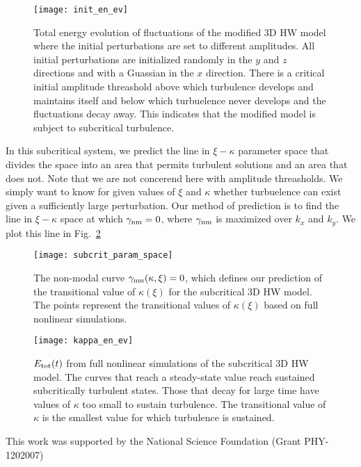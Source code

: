 \documentclass[letter,scriptaddress,twocolumn, prl,showkeys]{revtex4}
\begin{document}
\begin{figure}
\centerline{\texttt{[image: init\_en\_ev]}}
\caption{Total energy evolution of fluctuations of the modified 3D HW model where the initial perturbations are set to different amplitudes. All initial perturbations are initialized randomly in
the $y$ and $z$ directions and with a Guassian in the $x$ direction. There is a critical initial amplitude threashold above which turbulence develops and maintains itself
and below which turbuelence never develops and the fluctuations decay away. This indicates that the modified model is subject to subcritical turbulence.}
\label{init_en_ev}
\end{figure}

In this subcritical system, we predict the line in $\xi-\kappa$ parameter space that divides the space into an area that permits turbulent solutions and an area that does not. Note that we are
not concerend here with amplitude threasholds. We simply want to know for given values of $\xi$ and $\kappa$ whether turbuelence can exist given a sufficiently large perturbation. Our method
of prediction is to find the line in $\xi-\kappa$ space at which $\gamma_{\rm{nm}} = 0$, where $\gamma_{\rm{nm}}$ is maximized over $k_x$ and $k_y$. We plot this line in Fig.~\ref{subcrit_param_space}

\begin{figure}
\centerline{\texttt{[image: subcrit\_param\_space]}}
\caption{The non-modal curve $\gamma_{\rm{nm}}(\kappa,\xi) = 0$, which defines our prediction of the transitional value of $\kappa(\xi)$ for the subcritical 3D HW model. The points represent the
transitional values of $\kappa(\xi)$ based on full nonlinear simulations.}
\label{subcrit_param_space}
\end{figure}


\begin{figure}
\centerline{\texttt{[image: kappa\_en\_ev]}}
\caption{$E_{\rm{tot}}(t)$ from full nonlinear simulations of the subcritical 3D HW model. The curves that reach a steady-state value
reach sustained subcritically turbulent states. Those that decay for large time have values of $\kappa$ too small to sustain turbulence. The transitional value of $\kappa$ is the smallest value
for which turbulence is sustained.}
\label{kappa_en_ev}
\end{figure}


\begin{acknowledgments}
This work was supported by the National Science Foundation (Grant PHY-1202007)
\end{acknowledgments}


%

\end{document}
